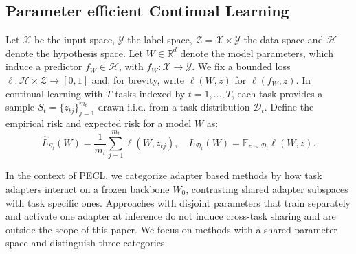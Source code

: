 \documentclass[10pt]{article} %
\newcommand\todo[1]{{\color{red} [TODO: #1]}}
\begin{document}
\subsection{Parameter efficient Continual Learning}
Let $\mathcal{X}$ be the input space, $\mathcal{Y}$ the label space, $\mathcal{Z} = \mathcal{X} \times \mathcal{Y}$ the data space and $\mathcal{H}$ denote the hypothesis space.
Let $W \in \mathbb{R}^d$ denote the model parameters, which induce a predictor
$f_W \in \mathcal{H}$, with $f_W : \mathcal{X} \to \mathcal{Y}$.
We fix a bounded loss \(\ell:\mathcal{H}\times\mathcal{Z}\to[0,1]\) and, for brevity, write \(\ell(W,z)\) for \(\ell(f_W,z)\). 
In continual learning with \(T\) tasks indexed by \(t=1,\dots,T\), each task provides a sample \(S_t =\{z_{tj}\}_{j=1}^{m_t}\) drawn i.i.d. from a task distribution \(\mathcal{D}_t\). Define the empirical risk and expected risk for a model \(W\) as:
$$
\hat{L}_{S_t}(W) = \frac{1}{m_t} \sum_{j=1}^{m_t} \ell(W, z_{tj}), \quad
L_{\mathcal{D}_t}(W) = \mathbb{E}_{z \sim \mathcal{D}_t} \ell(W, z).
$$









In the context of PECL, we categorize adapter based methods by how task adapters interact on a frozen backbone $W_0$, contrasting shared adapter subspaces with task specific ones.
Approaches with disjoint parameters that train separately and activate one adapter at inference do not induce cross-task sharing and are outside the scope of this paper\cite{Yu_2024_CVPR}.%
We focus on methods with a shared parameter space and distinguish three categories.
\end{document}
